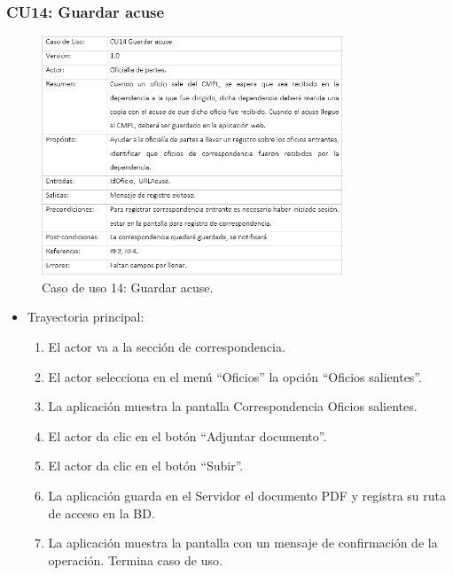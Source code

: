 		\subsubsection{CU14: Guardar acuse}
\begin{figure}[htbp!]
		\centering
			\includegraphics[width=0.8\textwidth]{images/CU/CU14}
		\caption{Caso de uso 14: Guardar acuse.}
		\label{Tabla}
	\end{figure}
	
\begin{itemize}
	\item Trayectoria principal:
	\begin{enumerate}
		\item 	El actor va a la sección de correspondencia.
\item	El actor selecciona en el menú “Oficios” la opción “Oficios salientes”.
\item	La aplicación muestra la pantalla  Correspondencia Oficios salientes.
\item	El actor da clic en el botón “Adjuntar documento”.
\item	El actor da clic en el botón “Subir”.
\item	La aplicación guarda en el Servidor el documento PDF y registra su ruta de acceso en la BD.
\item	La aplicación muestra la pantalla  con un mensaje de confirmación de la operación.
Termina caso de uso.

	\end{enumerate}
	
\end{itemize}
\newpage
